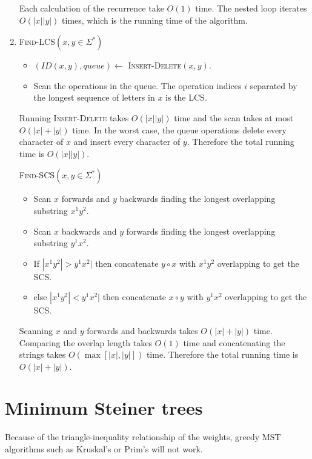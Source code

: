 \documentclass[12pt]{article}
\begin{document}
\begin{enumerate}
Each calculation of the recurrence take $O(1)$ time.
The nested loop iterates $O(|x||y|)$ times, which is the running time of
the algorithm.

\item %

\textsc{Find-LCS}$(x,y \in \Sigma^*)$
\begin{itemize}
\item
$(ID(x,y), queue) \gets$ \textsc{Insert-Delete}$(x,y)$.
\item
Scan the operations in the queue. The operation indices $i$ separated by the
longest sequence of letters in $x$ is the LCS.
\end{itemize}

Running \textsc{Insert-Delete} takes $O(|x||y|)$ time and the scan takes
at most $O(|x|+|y|)$ time. In the worst case, the queue operations delete
every character of $x$ and insert every character of $y$.
Therefore the total running time is $O(|x||y|)$.

\textsc{Find-SCS}$(x,y \in \Sigma^*)$
\begin{itemize}
\item
Scan $x$ forwards and $y$ backwards finding the longest overlapping substring
$x^1y^2$.
\item
Scan $x$ backwards and $y$ forwards finding the longest overlapping substring
$y^1x^2$.
\item
If $|x^1y^2| > y^1x^2|$ then concatenate $y\circ x$ with $x^1y^2$ overlapping
to get the SCS.
\item
else $|x^1y^2| < y^1x^2|$ then concatenate $x\circ y$ with $y^1x^2$ overlapping
to get the SCS.
\end{itemize}

Scanning $x$ and $y$ forwards and backwards takes $O(|x|+|y|)$ time.
Comparing the overlap length takes $O(1)$ time and concatenating the strings
takes $O(\max\left[|x|,|y|\right])$ time. Therefore the total running time
is $O(|x|+|y|)$.

\end{enumerate}

\pagebreak

\section{Minimum Steiner trees}

Because of the triangle-inequality relationship of the weights,
greedy MST algorithms such as Kruskal's or Prim's will not work.
\end{document}
